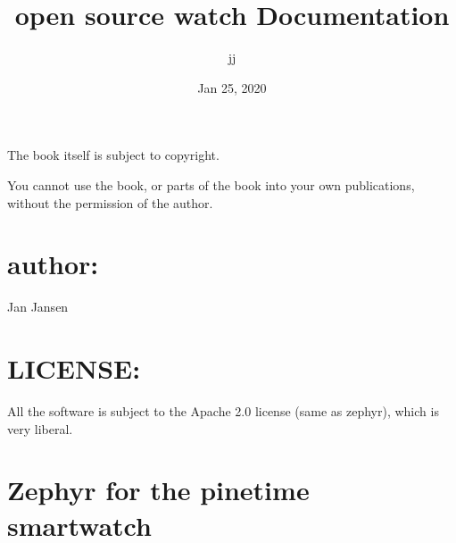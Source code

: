 \documentclass[letterpaper,10pt,english]{sphinxmanual}
\title{open source watch Documentation}
\date{Jan 25, 2020}
\author{jj}
\begin{document}
\pagestyle{empty}
\sphinxmaketitle
\pagestyle{plain}
\sphinxtableofcontents
\pagestyle{normal}
\label{\detokenize{index::doc}}
\noindent{}




The book itself is subject to copyright.

You cannot use the book, or parts of the book into your own publications, without the permission of the author.


\chapter{author:}
\label{\detokenize{copyright:author}}
Jan Jansen


\chapter{LICENSE:}
\label{\detokenize{copyright:license}}
All the software is subject to the Apache 2.0 license (same as zephyr), which is very liberal.


\chapter{Zephyr for the pinetime smartwatch}
\label{\detokenize{content:zephyr-for-the-pinetime-smartwatch}}\label{\detokenize{content::doc}}
\begin{sphinxVerbatim}[commandchars=\\\{\}]
           


           
\end{sphinxVerbatim}
\end{document}
